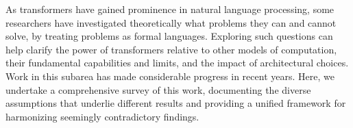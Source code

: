 As transformers have gained prominence in natural language processing, some researchers have investigated theoretically what problems they can and cannot solve, by treating problems as formal languages. Exploring such questions can help clarify the power of transformers relative to other models of computation, their fundamental capabilities and limits, and the impact of architectural choices. Work in this subarea has made considerable progress in recent years. Here, we undertake a comprehensive survey of this work, documenting the diverse assumptions that underlie different results and providing a unified framework for harmonizing seemingly contradictory findings.